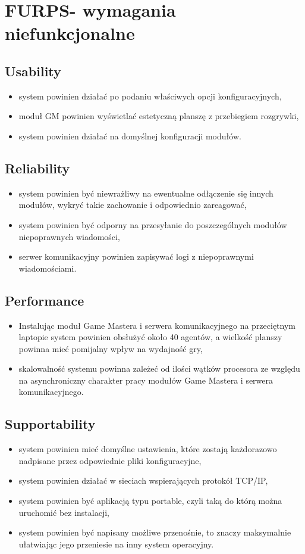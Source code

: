 \documentclass[11pt]{article}
\begin{document}
\section{FURPS- wymagania niefunkcjonalne}
\subsection{Usability}
\begin{itemize}
    \item system powinien działać po podaniu właściwych opcji konfiguracyjnych,
    \item moduł GM powinien wyświetlać estetyczną planszę z przebiegiem rozgrywki,
    \item system powinien działać na domyślnej konfiguracji modułów.
\end{itemize}

\subsection{Reliability}
\begin{itemize}
    \item system powinien być niewrażliwy na ewentualne odłączenie się innych modułów,
    wykryć takie zachowanie i odpowiednio zareagować,
    \item system powinien być odporny na przesyłanie do poszczególnych modułów niepoprawnych wiadomości,
    \item serwer komunikacyjny powinien zapisywać logi z niepoprawnymi wiadomościami.
\end{itemize}

\subsection{Performance}
\begin{itemize}
    \item Instalując moduł Game Mastera i serwera komunikacyjnego na przeciętnym laptopie system powinien obsłużyć około 40 agentów,
    a wielkość planszy powinna mieć pomijalny wpływ na wydajność gry,
    \item skalowalność systemu powinna zależeć od ilości wątków procesora ze względu na asynchroniczny charakter pracy modułów
    Game Mastera i serwera komunikacyjnego.
\end{itemize}

\subsection{Supportability}
\begin{itemize}
    \item system powinien mieć domyślne ustawienia, które zostają każdorazowo nadpisane przez odpowiednie pliki konfiguracyjne,
    \item system powinien działać w sieciach wspierających protokół TCP/IP,
    \item system powinien być aplikacją typu portable, czyli taką do którą można uruchomić bez instalacji,
    \item system powinien być napisany możliwe przenośnie, to znaczy maksymalnie ułatwiając jego przeniesie na inny system operacyjny.
\end{itemize}
\end{document}
